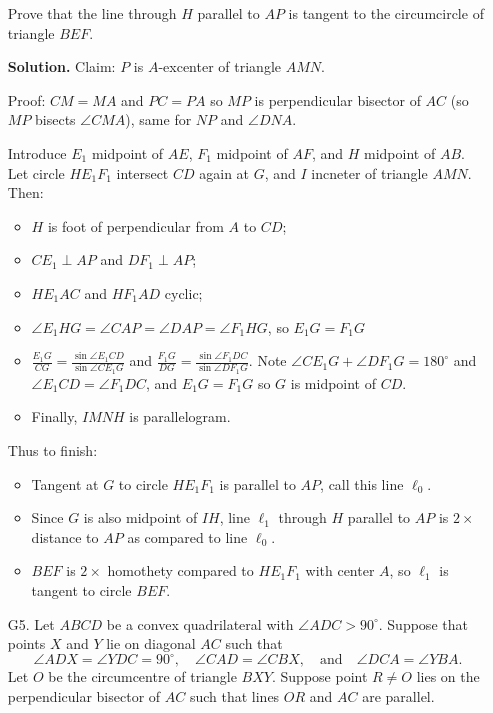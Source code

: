 \documentclass[11pt,a4paper]{article}
\begin{document}
\begin{enumerate}
    	Prove that the line through $H$ parallel to $AP$ is tangent to the circumcircle of triangle $BEF$.
    	
    	\textbf{Solution.} 
    	Claim: $P$ is $A$-excenter of triangle $AMN$. 
    	
    	Proof: $CM=MA$ and $PC=PA$ so $MP$ is perpendicular bisector of $AC$ (so $MP$ bisects $\angle CMA$), 
    	same for $NP$ and $\angle DNA$. 
    	
    	Introduce $E_1$ midpoint of $AE$, $F_1$ midpoint of $AF$, and $H$ midpoint of $AB$. Let circle $HE_1F_1$ intersect $CD$ again at $G$, 
    	and $I$ incneter of triangle $AMN$. 
    	Then: 
    	\begin{itemize}
    		\item $H$ is foot of perpendicular from $A$ to $CD$; 
    		\item $CE_1\perp AP$ and $DF_1\perp AP$; 
    		\item $HE_1AC$ and $HF_1AD$ cyclic; 
    		\item $\angle E_1HG=\angle CAP=\angle DAP=\angle F_1HG$, so $E_1G=F_1G$ 
    		\item $\frac{E_1G}{CG} = \frac{\sin\angle E_1CD}{\sin\angle CE_1G}$ and 
    		$\frac{F_1G}{DG} = \frac{\sin\angle F_1DC}{\sin\angle DF_1G}$. 
    		Note $\angle CE_1G+\angle DF_1G=180^{\circ}$ and $\angle E_1CD = \angle F_1DC$, and $E_1G=F_1G$ so $G$ is midpoint of $CD$. 
    		\item Finally, $IMNH$ is parallelogram. 
    	\end{itemize}
    	Thus to finish: 
    	\begin{itemize}
    		\item Tangent at $G$ to circle $HE_1F_1$ is parallel to $AP$, call this line $\ell_0$. 
    		
    		\item Since $G$ is also midpoint of $IH$, line $\ell_1$ through $H$ parallel to $AP$ is $2\times$ distance to $AP$ as compared to line $\ell_0$. 
    		
    		\item $BEF$ is $2\times$ homothety compared to $HE_1F_1$ with center $A$, so $\ell_1$ is tangent to circle $BEF$. 
    	\end{itemize}
        
        \item [G5.] Let $ABCD$ be a convex quadrilateral with $\angle ADC > 90^{\circ}$. Suppose that points $X$ and $Y$ lie on diagonal $AC$ such that
        $$\angle ADX = \angle YDC = 90^{\circ}, \quad \angle CAD = \angle CBX, \quad \text{and} \quad \angle DCA = \angle YBA.$$Let $O$ be the circumcentre of triangle $BXY$. Suppose point $R \neq O$ lies on the perpendicular bisector of $AC$ such that lines $OR$ and $AC$ are parallel.
        

\end{enumerate}
\end{document}
